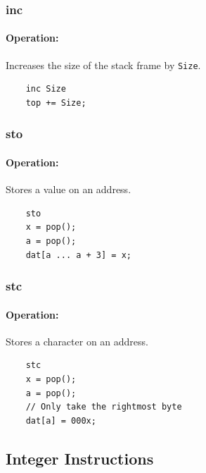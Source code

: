 \subsubsection{inc}

\paragraph{Operation:}
Increases the size of the stack frame by \lstinline$Size$.

	\begin{lstlisting}
	inc Size
	top += Size;
	\end{lstlisting}

\subsubsection{sto}

\paragraph{Operation:}
Stores a value on an address.

	\begin{lstlisting}
	sto
	x = pop();
	a = pop();
	dat[a ... a + 3] = x;
	\end{lstlisting}

\subsubsection{stc}

\paragraph{Operation:}
Stores a character on an address.

	\begin{lstlisting}
	stc
	x = pop();
	a = pop();
	// Only take the rightmost byte
	dat[a] = 000x;
	\end{lstlisting}

\subsection{Integer Instructions}


